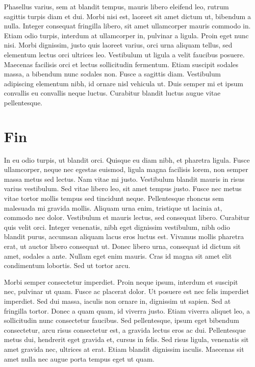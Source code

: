 \documentclass{ritsi/book}
\begin{document}
Phasellus varius, sem at blandit tempus, mauris libero eleifend leo, rutrum sagittis turpis diam et dui. Morbi nisi est, laoreet sit amet dictum ut, bibendum a nulla. Integer consequat fringilla libero, sit amet ullamcorper mauris commodo in. Etiam odio turpis, interdum at ullamcorper in, pulvinar a ligula. Proin eget nunc nisi. Morbi dignissim, justo quis laoreet varius, orci urna aliquam tellus, sed elementum lectus orci ultrices leo. Vestibulum ut ligula a velit faucibus posuere. Maecenas facilisis orci et lectus sollicitudin fermentum. Etiam suscipit sodales massa, a bibendum nunc sodales non. Fusce a sagittis diam. Vestibulum adipiscing elementum nibh, id ornare nisl vehicula ut. Duis semper mi et ipsum convallis eu convallis neque luctus. Curabitur blandit luctus augue vitae pellentesque.

\chapter{Fin}

In eu odio turpis, ut blandit orci. Quisque eu diam nibh, et pharetra ligula. Fusce ullamcorper, neque nec egestas euismod, ligula magna facilisis lorem, non semper massa metus sed lectus. Nam vitae mi justo. Vestibulum blandit mauris in risus varius vestibulum. Sed vitae libero leo, sit amet tempus justo. Fusce nec metus vitae tortor mollis tempus sed tincidunt neque. Pellentesque rhoncus sem malesuada mi gravida mollis. 
Aliquam urna enim, tristique ut lacinia at, commodo nec dolor. Vestibulum et mauris lectus, sed consequat libero. Curabitur quis velit orci. Integer venenatis, nibh eget dignissim vestibulum, nibh odio blandit purus, accumsan aliquam lacus eros luctus est. Vivamus mollis pharetra erat, ut auctor libero consequat ut. Donec libero urna, consequat id dictum sit amet, sodales a ante. Nullam eget enim mauris. Cras id magna sit amet elit condimentum lobortis. Sed ut tortor arcu.

Morbi semper consectetur imperdiet. Proin neque ipsum, interdum et suscipit nec, pulvinar ut quam. Fusce ac placerat dolor. Ut posuere est nec felis imperdiet imperdiet. Sed dui massa, iaculis non ornare in, dignissim ut sapien. Sed at fringilla tortor. Donec a quam quam, id viverra justo. Etiam viverra aliquet leo, a sollicitudin nunc consectetur faucibus. Sed pellentesque, ipsum eget bibendum consectetur, arcu risus consectetur est, a gravida lectus eros ac dui. Pellentesque metus dui, hendrerit eget gravida et, cursus in felis. Sed risus ligula, venenatis sit amet gravida nec, ultrices at erat. Etiam blandit dignissim iaculis. Maecenas sit amet nulla nec augue porta tempus eget ut quam.
\end{document}
